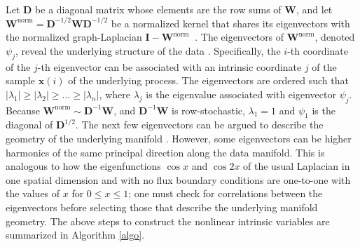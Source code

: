 \documentclass[aip,jcp,preprint]{revtex4-1}
\begin{document}
Let $\mathbf{D}$ be a diagonal matrix whose elements are the row sums of $\mathbf{W}$, and let $\mathbf{W}^{\mathrm{norm}} = \mathbf{D}^{-1/2}\mathbf{W}\mathbf{D}^{-1/2}$
be a normalized kernel that shares its eigenvectors with the normalized graph-Laplacian $\mathbf{I}-\mathbf{W}^{\mathrm{norm}} \:$ \cite{chung1997spectral}.
%
The eigenvectors of $\mathbf{W}^{\mathrm{norm}}$, denoted $\psi_j$, reveal the underlying structure of the data \cite{coifman2005geometric}.
%
Specifically, the $i$-th coordinate of the $j$-th eigenvector can be associated with an intrinsic coordinate $j$ of the sample $\mathbf{x}(i)$ of the underlying process.
%
The eigenvectors are ordered such that $|\lambda_1| \ge |\lambda_2| \ge \dots \ge |\lambda_n|$, where $\lambda_j$ is the eigenvalue associated with eigenvector $\psi_j$.
%
Because $\mathbf{W}^{\mathrm{norm}} \sim \mathbf{D}^{-1}\mathbf{W} $, and $\mathbf{D}^{-1}\mathbf{W}$ is row-stochastic,
$\lambda_1 = 1$ and $\psi_1$ is the diagonal of $\mathbf{D}^{1/2}$.
%
The next few eigenvectors can be argued to describe the geometry of the underlying manifold \cite{coifman2005geometric}.
%
However, some eigenvectors can be higher harmonics of the same principal direction along the data manifold.
This is analogous to how the eigenfunctions $\cos x$ and $\cos 2x$ of the usual Laplacian in one spatial dimension
and with no flux boundary conditions are one-to-one with the values of $x$ for $0 \le x \le 1$;
one must check for correlations between the eigenvectors before selecting those that describe the underlying manifold geometry.
%
The above steps to construct the nonlinear intrinsic variables are summarized in Algorithm \ref{algo}.
\end{document}
